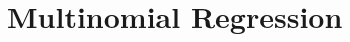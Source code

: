\documentclass[00-GLMregression.tex]{subfiles}
\begin{document}
	
\section{Multinomial Regression}

\begin{verbatim}



\end{verbatim}	
	

\end{document}
